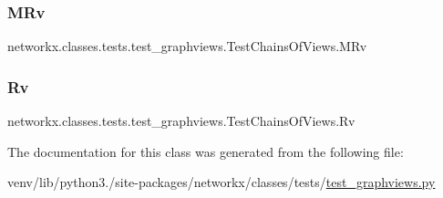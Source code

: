 \subsubsection{\texorpdfstring{M\+Rv}{MRv}}
{\footnotesize\ttfamily networkx.\+classes.\+tests.\+test\+\_\+graphviews.\+Test\+Chains\+Of\+Views.\+M\+Rv}

\mbox{\label{classnetworkx_1_1classes_1_1tests_1_1test__graphviews_1_1TestChainsOfViews_a4103446854bb24f7d119cbdcf7ec3c71}} 
\subsubsection{\texorpdfstring{Rv}{Rv}}
{\footnotesize\ttfamily networkx.\+classes.\+tests.\+test\+\_\+graphviews.\+Test\+Chains\+Of\+Views.\+Rv}



The documentation for this class was generated from the following file\+:\begin{DoxyCompactItemize}
\item 
venv/lib/python3./site-\/packages/networkx/classes/tests/\hyperlink{test__graphviews_8py}{test\+\_\+graphviews.\+py}\end{DoxyCompactItemize}
